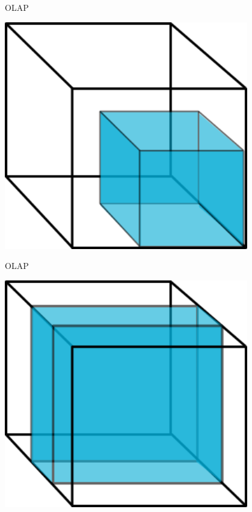 \documentclass{beamer}
\begin{document}
\begin{frame}{OLAP}
    \begin{center}
        \includegraphics[width=0.8\textwidth]{cube-bigselection.png}
    \end{center}
\end{frame}

\begin{frame}{OLAP}
    \begin{center}
        \includegraphics[width=0.8\textwidth]{cube-slice.png}
    \end{center}
\end{frame}
\end{document}
